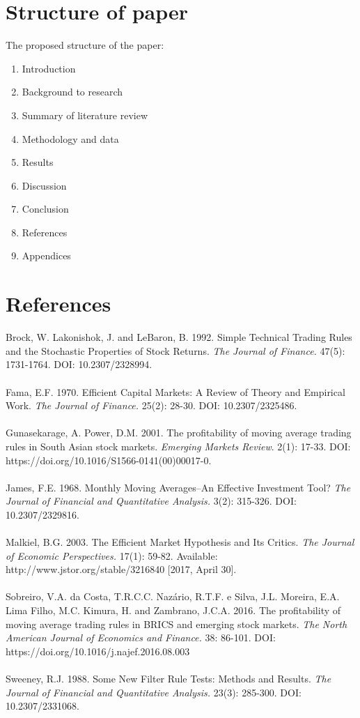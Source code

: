 \documentclass[12pt]{article}
\begin{document}
\section{Structure of paper}
The proposed structure of the paper:
\begin{enumerate}
\item Introduction
\item Background to research
\item Summary of literature review
\item Methodology and data
\item Results
\item Discussion 
\item Conclusion
\item References
\item Appendices

\end{enumerate}
\newpage
\section{References}

\noindent
Brock, W. Lakonishok, J. and LeBaron, B. 1992. Simple Technical Trading Rules and the Stochastic Properties of Stock Returns. \textit{The Journal of Finance.} 47(5): 1731-1764. DOI: 10.2307/2328994.
\\
\\
Fama, E.F. 1970. Efficient Capital Markets: A Review of Theory and Empirical Work. \textit{The Journal of Finance.} 25(2): 28-30. DOI: 10.2307/2325486. 
\\
\\
Gunasekarage, A. Power, D.M. 2001. The profitability of moving average trading rules in South Asian stock markets. \textit{Emerging Markets Review}. 2(1): 17-33. DOI: https://doi.org/10.1016/S1566-0141(00)00017-0.
\\
\\
James, F.E. 1968. Monthly Moving Averages--An Effective Investment Tool? \textit{The Journal of Financial and Quantitative Analysis.} 3(2): 315-326. DOI: 10.2307/2329816. 
\\
\\
Malkiel, B.G. 2003. The Efficient Market Hypothesis and Its Critics. \textit{The Journal of Economic Perspectives.} 17(1):  59-82.  Available: http://www.jstor.org/stable/3216840 [2017, April 30].
\\
\\
Sobreiro, V.A. da Costa, T.R.C.C. Nazário, R.T.F. e Silva, J.L. Moreira, E.A. Lima Filho, M.C. Kimura, H. and Zambrano, J.C.A. 2016. The profitability of moving average trading rules in BRICS and emerging stock markets. \textit{The North American Journal of Economics and Finance.} 38: 86-101. DOI: https://doi.org/10.1016/j.najef.2016.08.003
\\
\\
Sweeney, R.J. 1988. Some New Filter Rule Tests: Methods and Results. \textit{The Journal of Financial and Quantitative Analysis.} 23(3): 285-300. DOI: 10.2307/2331068.
\end{document}
